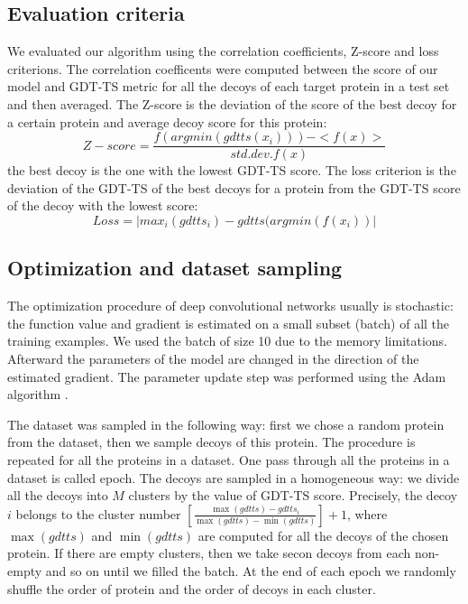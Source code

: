 \documentclass[a4paper,10pt]{article}
\begin{document}
\subsection{Evaluation criteria}
We evaluated our algorithm using the correlation coefficients, Z-score and loss criterions. The correlation coefficents 
were computed between the score of 
our model and GDT-TS metric for all the decoys of each target protein in a test set and then averaged. 
The Z-score is the deviation of the score of 
the best decoy for a certain protein and average decoy score for this protein:
$$ 
Z-score = \frac{f( argmin(gdtts(x_i)) ) - <f(x)>}{std.dev.f(x)}
$$ 
the best decoy is the one with the lowest GDT-TS score. 
The loss criterion is the deviation of the GDT-TS of the best decoys for a protein from the GDT-TS score of the decoy with the lowest score:
$$ 
Loss = | max_i( gdtts_i ) - gdtts( argmin(f(x_i) ) |
$$ 

\subsection{Optimization and dataset sampling}
The optimization procedure of deep convolutional networks usually is stochastic: the function value and gradient 
is estimated on a small subset (batch) of all the training 
examples. We used the batch of size 10 due to the memory limitations. Afterward the parameters of the model are 
changed in the direction of the estimated gradient.
The parameter update step was performed using the Adam algorithm \cite{}. 

The dataset was sampled in the following way: first we chose a random protein from the dataset, then we sample decoys of this protein. 
The procedure is repeated for all the 
proteins in a dataset. One pass through all the proteins in a dataset is called epoch. 
The decoys are sampled in a homogeneous way: we divide all the decoys into $M$ clusters by the value of GDT-TS score. 
Precisely, the decoy $i$ belongs to the cluster  
number $ \left[ \frac{\max(gdtts) - gdtts_i}{\max(gdtts) - \min(gdtts)} \right] + 1$, where $\max(gdtts)$ and $\min(gdtts)$ 
are computed for all the decoys of 
the chosen protein. If there are empty clusters, then we take secon decoys from each non-empty and so on until we filled the batch. 
At the end of each epoch we randomly
shuffle the order of protein and the order of decoys in each cluster. 
\end{document}
